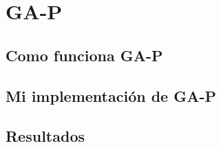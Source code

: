 \section{GA-P}

\subsection{Como funciona GA-P}

\subsection{Mi implementación de GA-P}

\subsection{Resultados}
